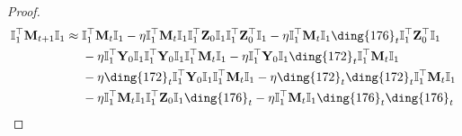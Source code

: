 \documentclass{article}
\theoremstyle{plain}
\theoremstyle{remark}
\def\bY{\mathbf{Y}}
\def\bZ{\mathbf{Z}}
\newcommand{\cc}[1]{\text{\ding{\number\numexpr#1 + 171\relax}}}
\begin{document}
\begin{proof}
    \begin{align*}
        \mathbb{I}_{1}^\top\mathbf{M}_{t+1} \mathbb{I}_{1}
        &\approx
            \mathbb{I}_{1}^\top\mathbf{M}_{t} \mathbb{I}_{1}
            - \eta\mathbb{I}_{1}^\top \mathbf{M}_{t}\mathbb{I}_{1}\mathbb{I}_{1}^\top\bZ_0\mathbb{I}_{1}\mathbb{I}_{1}^\top \bZ_0^\top\mathbb{I}_{1}
            - \eta\mathbb{I}_{1}^\top \mathbf{M}_{t}\mathbb{I}_{1}\cc{5}_t\mathbb{I}_{1}^\top \bZ_0^\top\mathbb{I}_{1}
        \\
        &~~~~ 
            - \eta \mathbb{I}_{1}^\top \bY_0 \mathbb{I}_{1}\mathbb{I}_{1}^\top \bY_0\mathbb{I}_{1}\mathbb{I}_{1}^\top\mathbf{M}_{t} \mathbb{I}_{1} 
            - \eta \mathbb{I}_{1}^\top \bY_0 \mathbb{I}_{1}\cc{1}_t\mathbb{I}_{1}^\top\mathbf{M}_{t} \mathbb{I}_{1}
        \\
        &~~~~ 
            - \eta \cc{1}_t\mathbb{I}_{1}^\top \bY_0\mathbb{I}_{1}\mathbb{I}_{1}^\top\mathbf{M}_{t} \mathbb{I}_{1} 
            - \eta \cc{1}_t\cc{1}_t\mathbb{I}_{1}^\top\mathbf{M}_{t} \mathbb{I}_{1}
        \\
        &~~~~ 
            - \eta\mathbb{I}_{1}^\top \mathbf{M}_{t}\mathbb{I}_{1}\mathbb{I}_{1}^\top\bZ_0\mathbb{I}_{1}\cc{5}_t 
            - \eta\mathbb{I}_{1}^\top \mathbf{M}_{t}\mathbb{I}_{1}\cc{5}_t\cc{5}_t 

\end{align*}
\end{proof}
\end{document}
